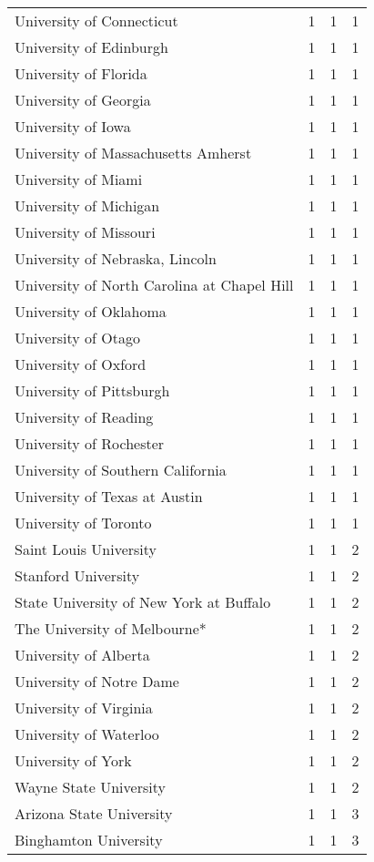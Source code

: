 \begin{longtable}[t]{llll}
University of Connecticut & 1 & 1 & 1\\
University of Edinburgh & 1 & 1 & 1\\
\addlinespace
University of Florida & 1 & 1 & 1\\
University of Georgia & 1 & 1 & 1\\
University of Iowa & 1 & 1 & 1\\
University of Massachusetts Amherst & 1 & 1 & 1\\
University of Miami & 1 & 1 & 1\\
\addlinespace
University of Michigan & 1 & 1 & 1\\
University of Missouri & 1 & 1 & 1\\
University of Nebraska, Lincoln & 1 & 1 & 1\\
University of North Carolina at Chapel Hill & 1 & 1 & 1\\
University of Oklahoma & 1 & 1 & 1\\
\addlinespace
University of Otago & 1 & 1 & 1\\
University of Oxford & 1 & 1 & 1\\
University of Pittsburgh & 1 & 1 & 1\\
University of Reading & 1 & 1 & 1\\
University of Rochester & 1 & 1 & 1\\
\addlinespace
University of Southern California & 1 & 1 & 1\\
University of Texas at Austin & 1 & 1 & 1\\
University of Toronto & 1 & 1 & 1\\
Saint Louis University & 1 & 1 & 2\\
Stanford University & 1 & 1 & 2\\
\addlinespace
State University of New York at Buffalo & 1 & 1 & 2\\
The University of Melbourne* & 1 & 1 & 2\\
University of Alberta & 1 & 1 & 2\\
University of Notre Dame & 1 & 1 & 2\\
University of Virginia & 1 & 1 & 2\\
\addlinespace
University of Waterloo & 1 & 1 & 2\\
University of York & 1 & 1 & 2\\
Wayne State University & 1 & 1 & 2\\
Arizona State University & 1 & 1 & 3\\
Binghamton University & 1 & 1 & 3\\

\end{longtable}
